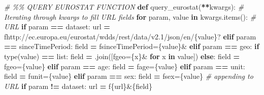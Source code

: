 \documentclass[
  a4paper]{article}
\newenvironment{Shaded}{\begin{snugshade}}{\end{snugshade}}
\newcommand{\BuiltInTok}[1]{#1}
\newcommand{\CommentTok}[1]{\textcolor[rgb]{0.56,0.35,0.01}{\textit{#1}}}
\newcommand{\ControlFlowTok}[1]{\textcolor[rgb]{0.13,0.29,0.53}{\textbf{#1}}}
\newcommand{\KeywordTok}[1]{\textcolor[rgb]{0.13,0.29,0.53}{\textbf{#1}}}
\newcommand{\NormalTok}[1]{#1}
\newcommand{\OperatorTok}[1]{\textcolor[rgb]{0.81,0.36,0.00}{\textbf{#1}}}
\newcommand{\SpecialCharTok}[1]{\textcolor[rgb]{0.00,0.00,0.00}{#1}}
\newcommand{\SpecialStringTok}[1]{\textcolor[rgb]{0.31,0.60,0.02}{#1}}
\newcommand{\StringTok}[1]{\textcolor[rgb]{0.31,0.60,0.02}{#1}}
\begin{document}
\begin{Shaded}
\begin{Highlighting}[]
\CommentTok{\# \%\% QUERY EUROSTAT FUNCTION}
\KeywordTok{def}\NormalTok{ query\_eurostat(}\OperatorTok{**}\NormalTok{kwargs):}
    \CommentTok{\# Iterating through kwargs to fill URL fields}
    \ControlFlowTok{for}\NormalTok{ param, value }\KeywordTok{in}\NormalTok{ kwargs.items():}
        \CommentTok{\# URL}
        \ControlFlowTok{if}\NormalTok{ param }\OperatorTok{==} \StringTok{\textquotesingle{}dataset\textquotesingle{}}\NormalTok{:}
\NormalTok{            url }\OperatorTok{=} \SpecialStringTok{f\textquotesingle{}http://ec.europa.eu/eurostat/wdds/rest/data/v2.1/json/en/}\SpecialCharTok{\{}\NormalTok{value}\SpecialCharTok{\}}\SpecialStringTok{?\textquotesingle{}}
        \ControlFlowTok{elif}\NormalTok{ param }\OperatorTok{==} \StringTok{\textquotesingle{}sinceTimePeriod\textquotesingle{}}\NormalTok{:}
\NormalTok{            field }\OperatorTok{=} \SpecialStringTok{f\textquotesingle{}sinceTimePeriod=}\SpecialCharTok{\{}\NormalTok{value}\SpecialCharTok{\}}\SpecialStringTok{\&\textquotesingle{}}
        \ControlFlowTok{elif}\NormalTok{ param }\OperatorTok{==} \StringTok{\textquotesingle{}geo\textquotesingle{}}\NormalTok{:}
            \ControlFlowTok{if} \BuiltInTok{type}\NormalTok{(value) }\OperatorTok{==} \BuiltInTok{list}\NormalTok{:}
\NormalTok{                field }\OperatorTok{=} \StringTok{\textquotesingle{}\textquotesingle{}}\NormalTok{.join([}\SpecialStringTok{f\textquotesingle{}geo=}\SpecialCharTok{\{x\}}\SpecialStringTok{\&\textquotesingle{}} \ControlFlowTok{for}\NormalTok{ x }\KeywordTok{in}\NormalTok{ value])}
            \ControlFlowTok{else}\NormalTok{:}
\NormalTok{                field }\OperatorTok{=} \SpecialStringTok{f\textquotesingle{}geo=}\SpecialCharTok{\{}\NormalTok{value}\SpecialCharTok{\}}\SpecialStringTok{\textquotesingle{}}
        \ControlFlowTok{elif}\NormalTok{ param }\OperatorTok{==} \StringTok{\textquotesingle{}age\textquotesingle{}}\NormalTok{:}
\NormalTok{            field }\OperatorTok{=} \SpecialStringTok{f\textquotesingle{}age=}\SpecialCharTok{\{}\NormalTok{value}\SpecialCharTok{\}}\SpecialStringTok{\textquotesingle{}}
        \ControlFlowTok{elif}\NormalTok{ param }\OperatorTok{==} \StringTok{\textquotesingle{}unit\textquotesingle{}}\NormalTok{:}
\NormalTok{            field }\OperatorTok{=} \SpecialStringTok{f\textquotesingle{}unit=}\SpecialCharTok{\{}\NormalTok{value}\SpecialCharTok{\}}\SpecialStringTok{\textquotesingle{}}
        \ControlFlowTok{elif}\NormalTok{ param }\OperatorTok{==} \StringTok{\textquotesingle{}sex\textquotesingle{}}\NormalTok{:}
\NormalTok{            field }\OperatorTok{=} \SpecialStringTok{f\textquotesingle{}sex=}\SpecialCharTok{\{}\NormalTok{value}\SpecialCharTok{\}}\SpecialStringTok{\textquotesingle{}}
        \CommentTok{\# appending to URL}
        \ControlFlowTok{if}\NormalTok{ param }\OperatorTok{!=} \StringTok{\textquotesingle{}dataset\textquotesingle{}}\NormalTok{:}
\NormalTok{            url }\OperatorTok{=} \SpecialStringTok{f\textquotesingle{}}\SpecialCharTok{\{}\NormalTok{url}\SpecialCharTok{\}}\SpecialStringTok{\&}\SpecialCharTok{\{}\NormalTok{field}\SpecialCharTok{\}}\SpecialStringTok{\textquotesingle{}}


\end{Highlighting}
\end{Shaded}
\end{document}
